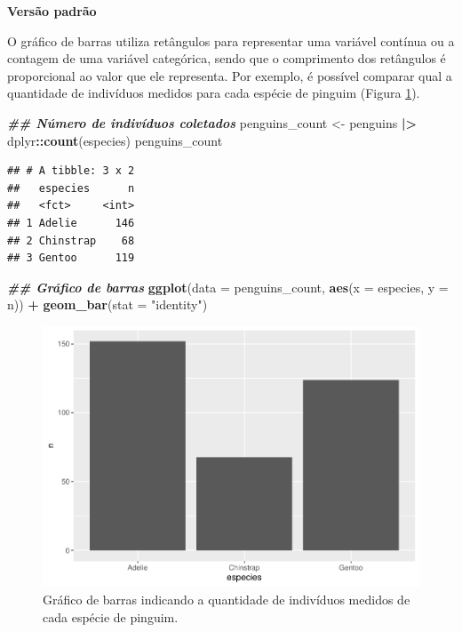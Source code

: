 \documentclass[
]{article}
\newenvironment{Shaded}{\begin{snugshade}}{\end{snugshade}}
\newcommand{\AttributeTok}[1]{\textcolor[rgb]{0.13,0.29,0.53}{#1}}
\newcommand{\DocumentationTok}[1]{\textcolor[rgb]{0.56,0.35,0.01}{\textbf{\textit{#1}}}}
\newcommand{\FunctionTok}[1]{\textcolor[rgb]{0.13,0.29,0.53}{\textbf{#1}}}
\newcommand{\NormalTok}[1]{#1}
\newcommand{\OtherTok}[1]{\textcolor[rgb]{0.56,0.35,0.01}{#1}}
\newcommand{\SpecialCharTok}[1]{\textcolor[rgb]{0.81,0.36,0.00}{\textbf{#1}}}
\newcommand{\StringTok}[1]{\textcolor[rgb]{0.31,0.60,0.02}{#1}}
\begin{document}
\textbf{Versão padrão}

O gráfico de barras utiliza retângulos para representar uma variável contínua ou a contagem de uma variável categórica, sendo que o comprimento dos retângulos é proporcional ao valor que ele representa. Por exemplo, é possível comparar qual a quantidade de indivíduos medidos para cada espécie de pinguim (Figura \ref{fig:fig-bar-species}).

\begin{Shaded}
\begin{Highlighting}[]
\DocumentationTok{\#\# Número de indivíduos coletados}
\NormalTok{penguins\_count }\OtherTok{\textless{}{-}}\NormalTok{ penguins }\SpecialCharTok{|\textgreater{}} 
\NormalTok{  dplyr}\SpecialCharTok{::}\FunctionTok{count}\NormalTok{(especies)}
\NormalTok{penguins\_count}
\end{Highlighting}
\end{Shaded}

\begin{verbatim}
## # A tibble: 3 x 2
##   especies      n
##   <fct>     <int>
## 1 Adelie      146
## 2 Chinstrap    68
## 3 Gentoo      119
\end{verbatim}

\begin{Shaded}
\begin{Highlighting}[]
\DocumentationTok{\#\# Gráfico de barras}
\FunctionTok{ggplot}\NormalTok{(}\AttributeTok{data =}\NormalTok{ penguins\_count, }\FunctionTok{aes}\NormalTok{(}\AttributeTok{x =}\NormalTok{ especies, }\AttributeTok{y =}\NormalTok{ n)) }\SpecialCharTok{+} 
    \FunctionTok{geom\_bar}\NormalTok{(}\AttributeTok{stat =} \StringTok{"identity"}\NormalTok{)}
\end{Highlighting}
\end{Shaded}

\begin{figure}
\includegraphics[width=0.75\linewidth,height=0.75\textheight]{epr_files/figure-latex/fig-bar-species-1} \caption{Gráfico de barras indicando a quantidade de indivíduos medidos de cada espécie de pinguim.}\label{fig:fig-bar-species}
\end{figure}
\end{document}

